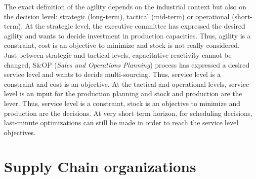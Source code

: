 The exact definition of the agility depends on the industrial context but also on the decision level: strategic (long-term), tactical (mid-term) or operational (short-term).
At the strategic level, the executive committee has expressed the desired agility and wants to decide investment in production capacities.
Thus, agility is a constraint, cost is an objective to minimize and stock is not really considered.
Just between strategic and tactical levels, capacitative reactivity cannot be changed, S\&OP (\emph{Sales and Operations Planning}) process has expressed a desired service level and wants to decide multi-sourcing.
Thus, service level is a constraint and cost is an objective.
At the tactical and operational levels, service level is an input for the production planning and stock and production are the lever.
Thus, service level is a constraint, stock is an objective to minimize and production are the decisions.
At very short term horizon, \eg for scheduling decisions, last-minute optimizations can still be made in order to reach the service level objectives.


\section{Supply Chain organizations}


